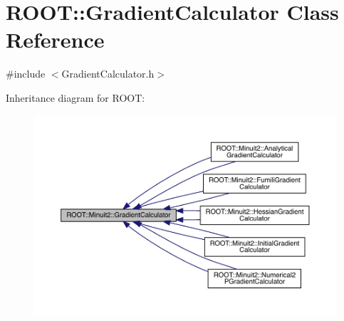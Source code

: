 \hypertarget{classROOT_1_1Minuit2_1_1GradientCalculator}{}\section{R\+O\+OT\+:\+:Gradient\+Calculator Class Reference}
\label{classROOT_1_1Minuit2_1_1GradientCalculator}


{\ttfamily \#include $<$Gradient\+Calculator.\+h$>$}



Inheritance diagram for R\+O\+OT\+:\nopagebreak
\begin{figure}[H]
\begin{center}
\leavevmode
\includegraphics[width=350pt]{dd/dd0/classROOT_1_1Minuit2_1_1GradientCalculator__inherit__graph}
\end{center}
\end{figure}
